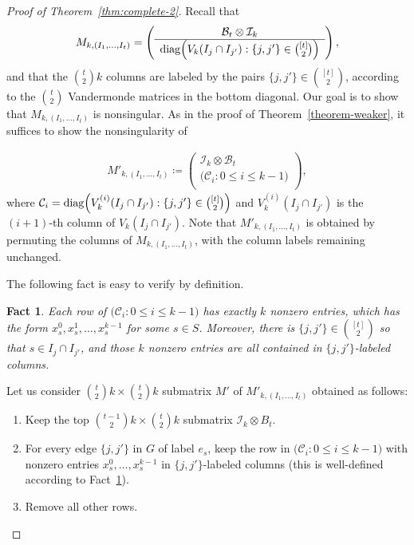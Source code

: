 \documentclass[11pt]{article}
\newtheorem{fact}[theorem]{Fact}
\newcommand{\ma}{\mathcal}
\begin{document}
\begin{proof}[Proof of Theorem~\ref{thm:complete-2}]
Recall that
\begin{align}
  M_{k,(I_1,\dots,I_t)} =
  \left(
  \begin{array}{c}
    \mathcal{B}_t\otimes \mathcal{I}_k  \\\hline
  {\rm diag}\Big(V_k(I_j\cap I_{j'}): \{j,j'\}\in \binom{[t]}{2}\Big) \\
  \end{array}
\right),
\label{}
\end{align}
and that the $\binom{t}{2}k$ columns are labeled by the pairs $\{j,j'\}\in\binom{[t]}{2}$, according to the $\binom{t}{2}$ Vandermonde matrices in the bottom diagonal.
Our goal is to show that $M_{k,(I_1,\dots,I_t)}$ is nonsingular. As in the proof of Theorem~\ref{theorem-weaker}, it suffices to show the nonsingularity of

\begin{align}
M'_{k,(I_1,\ldots,I_t)}
\coloneqq
\left(
  \begin{array}{c}
  \mathcal{I}_k\otimes \mathcal{B}_t  \\\hline
  \big(\ma{C}_i:0\le i\le k-1\big) \\
  \end{array}
\right),
\end{align}
where $\ma{C}_i={\rm diag}\Big(V_k^{(i)}(I_j\cap I_{j'}): \{j,j'\}\in \binom{[t]}{2}\Big)$ and $V_k^{(i)}(I_j\cap I_{j'})$ is the $(i+1)$-th column of $V_k(I_j\cap I_{j'})$. Note that $M'_{k,(I_1,\ldots,I_t)}$ is obtained by permuting the columns of $M_{k,(I_1,\ldots,I_t)}$, with the column labels remaining unchanged.

The following fact is easy to verify by definition.

\begin{fact}\label{fact:M'-1}
Each row of $\big(\ma{C}_i:0\le i\le k-1\big)$ has exactly $k$ nonzero entries, which has the form $x_s^0, x_s^1,\dots,x_s^{k-1}$ for some $s\in S$. Moreover, there is $\{j,j'\}\in\binom{[t]}{2}$ so that $s\in I_j\cap I_{j'}$, and those $k$ nonzero entries are all contained in $\{j,j'\}$-labeled columns.
\end{fact}

Let us consider $\binom{t}{2}k\times \binom{t}{2}k$ submatrix $M'$ of $M'_{k,(I_1,\dots,I_t)}$ obtained as follows:

\begin{enumerate}
\item Keep the top $\binom{t-1}{2}k\times \binom{t}{2}k$ submatrix $\mathcal{I}_k\otimes B_t$.
\item For every edge $\{j,j'\}$ in $G$ of label $e_s$, keep the row in $\big(\ma{C}_i:0\le i\le k-1\big)$ with nonzero entries $x_s^0,\dots,x_s^{k-1}$ in $\{j,j'\}$-labeled columns (this is well-defined according to Fact~\ref{fact:M'-1}).
\item Remove all other rows.
\end{enumerate}


\end{proof}
\end{document}
